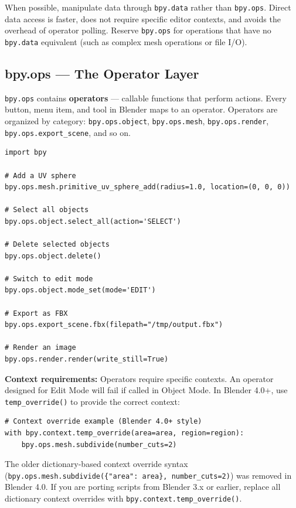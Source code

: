 \begin{tipbox}
When possible, manipulate data through \texttt{bpy.data} rather than \texttt{bpy.ops}. Direct data access is faster, does not require specific editor contexts, and avoids the overhead of operator polling. Reserve \texttt{bpy.ops} for operations that have no \texttt{bpy.data} equivalent (such as complex mesh operations or file I/O).
\end{tipbox}

\subsection{bpy.ops --- The Operator Layer}

\texttt{bpy.ops} contains \textbf{operators} --- callable functions that perform actions. Every button, menu item, and tool in Blender maps to an operator. Operators are organized by category: \texttt{bpy.ops.object}, \texttt{bpy.ops.mesh}, \texttt{bpy.ops.render}, \texttt{bpy.ops.export\_scene}, and so on.

\begin{lstlisting}
import bpy

# Add a UV sphere
bpy.ops.mesh.primitive_uv_sphere_add(radius=1.0, location=(0, 0, 0))

# Select all objects
bpy.ops.object.select_all(action='SELECT')

# Delete selected objects
bpy.ops.object.delete()

# Switch to edit mode
bpy.ops.object.mode_set(mode='EDIT')

# Export as FBX
bpy.ops.export_scene.fbx(filepath="/tmp/output.fbx")

# Render an image
bpy.ops.render.render(write_still=True)
\end{lstlisting}

\textbf{Context requirements:} Operators require specific contexts. An operator designed for Edit Mode will fail if called in Object Mode. In Blender 4.0+, use \texttt{temp\_override()} to provide the correct context:

\begin{lstlisting}
# Context override example (Blender 4.0+ style)
with bpy.context.temp_override(area=area, region=region):
    bpy.ops.mesh.subdivide(number_cuts=2)
\end{lstlisting}

\begin{warningbox}
The older dictionary-based context override syntax (\texttt{bpy.ops.mesh.subdivide(\{"area": area\}, number\_cuts=2)}) was removed in Blender 4.0. If you are porting scripts from Blender 3.x or earlier, replace all dictionary context overrides with \texttt{bpy.context.temp\_override()}.
\end{warningbox}

